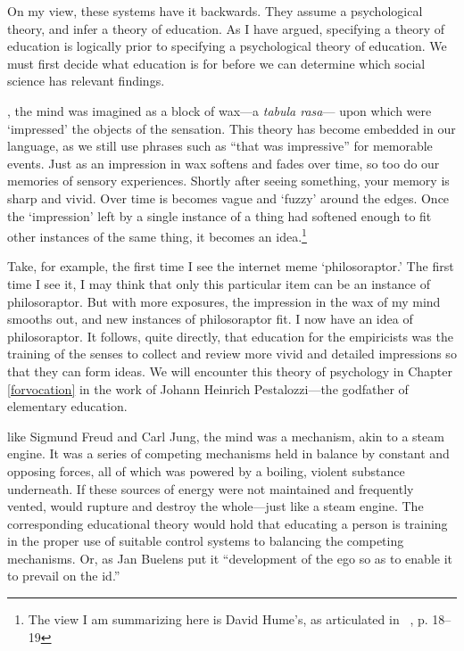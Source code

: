 On my view, these systems have it backwards. They assume a psychological theory, and infer a theory of education. As I have argued, specifying a theory of education is logically prior to specifying a psychological theory of education. We must first decide what education is for before we can determine which social science has relevant findings.

, the mind was imagined as a block of wax---a \emph{tabula rasa}--- upon which were `impressed' the objects of the sensation. This theory has become embedded in our language, as we still use phrases such as ``that was impressive'' for memorable events. Just as an impression in wax softens and fades over time, so too do our memories of sensory experiences. Shortly after seeing something, your memory is sharp and vivid. Over time is becomes vague and `fuzzy' around the edges. Once the `impression' left by a single instance of a thing had softened enough to fit other instances of the same thing, it becomes an idea.\footnote{The view I am summarizing here is David Hume's, as articulated in ~\citep{Hume:IGMvPNU2}, p. 18--19} 

Take, for example, the first time I see the internet meme `philosoraptor.' The first time I see it, I may think that only this particular item can be an instance of philosoraptor. But with more exposures, the impression in the wax of my mind smooths out, and new instances of philosoraptor fit. I now have an idea of philosoraptor. It follows, quite directly, that education for the empiricists was the training of the senses to collect and review more vivid and detailed impressions so that they can form ideas. We will encounter this theory of psychology in Chapter \ref{forvocation} in the work of Johann Heinrich Pestalozzi---the godfather of elementary education.

 like Sigmund Freud and Carl Jung, the mind was a mechanism, akin to a steam engine. It was a series of competing mechanisms held in balance by constant and opposing forces, all of which was powered by a boiling, violent substance underneath. If these sources of energy were not maintained and frequently vented, would rupture and destroy the whole---just like a steam engine. The corresponding educational theory would hold that educating a person is training in the proper use of suitable control systems to balancing the competing mechanisms. Or, as Jan Buelens put it ``development of the ego so as to enable it to prevail on the id.'' ~\citep[p. 61]{Buelens:1966ud}

